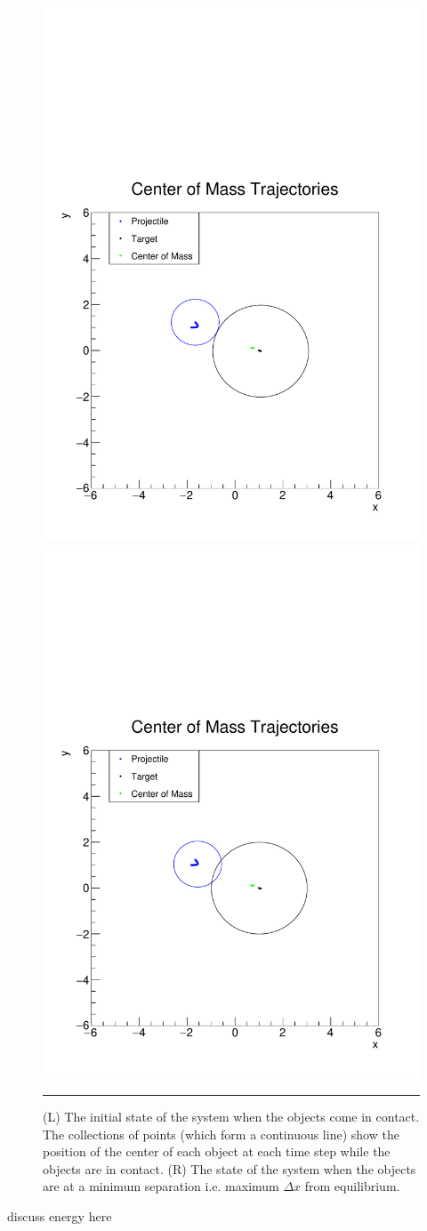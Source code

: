 \documentclass[aps,prl,floatfix,preprint,nofootinbib]{revtex4}
\begin{document}
\begin{figure}[h!]
  \includegraphics[width=.45\textwidth]{plots/default/x_vs_y_with_ellipse.pdf}
  \includegraphics[width=.45\textwidth]{plots/default/x_vs_y_with_ellipse_MS.pdf}
                  {\par\nobreak\rule[9pt]{35em}{0.5pt}\vspace{-5mm}}
                  \caption{(L) The initial state of the system when the objects come in contact. The collections of points (which form a continuous line) show the position of the center of each object at each time step while the objects are in contact. (R) The state of the system when the objects are at a minimum separation i.e. maximum $\Delta x$ from equilibrium.}
                  \label{fig:tracks_default}
\end{figure}

discuss energy here
\end{document}
